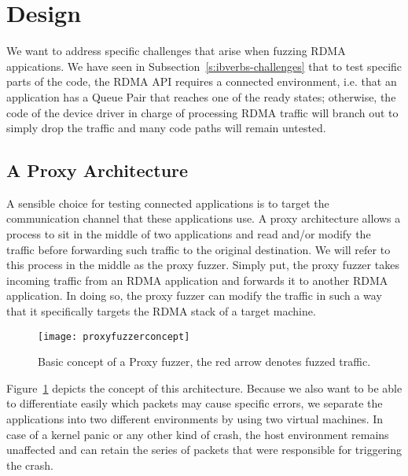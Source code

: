 \section{Design}\label{s:design}


We want to address specific challenges that arise when fuzzing
RDMA appications. We have seen in Subsection~\ref{s:ibverbs-challenges}
that to test specific parts of the code, the RDMA API requires a connected environment, i.e.
that an application has a Queue Pair that reaches one of the ready states; otherwise,
the code of the device driver in charge of processing RDMA traffic will branch out
to simply drop the traffic and many code paths will remain untested.

\subsection{A Proxy Architecture}

A sensible choice for testing connected applications is to
target the communication channel that these applications use.
A proxy architecture allows a process to sit in the middle of two applications
and read and/or modify the traffic before forwarding such traffic to the original destination.
We will refer to this process in the middle as the proxy fuzzer. Simply put, the proxy fuzzer
takes incoming traffic from an RDMA application and forwards it to another RDMA application.
In doing so, the proxy fuzzer can modify the traffic in such a way that it specifically targets the RDMA stack of a target machine.

\begin{figure}[h]
   \centering
   \texttt{[image: proxyfuzzerconcept]}
   \caption[Proxy fuzzer concept]{Basic concept of a Proxy fuzzer, the red arrow denotes fuzzed traffic.}\label{fig:fuzzerconcept}
\end{figure}

Figure~\ref{fig:fuzzerconcept} depicts the concept of this architecture. Because we also want to be able to differentiate
easily which packets may cause specific errors, we separate the applications into two different environments by
using two virtual machines. In case of a kernel panic or any other kind of crash, the host environment remains unaffected
and can retain the series of packets that were responsible for triggering the crash.

